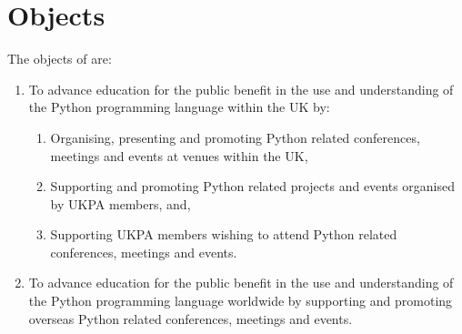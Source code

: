 \section{Objects}\label{sec:objects}
The objects of \shortname{} are:
\begin{enumerate}
        \item To advance education for the public benefit in the use and understanding of the Python programming language within the UK by:
        \begin{enumerate}
                \item Organising, presenting and promoting Python related conferences, meetings and events at venues within the UK,
                \item Supporting and promoting Python related projects and events organised by UKPA members, and,
                \item Supporting UKPA members wishing to attend Python related conferences, meetings and events.
        \end{enumerate}
        \item To advance education for the public benefit in the use and understanding of the Python programming language worldwide by supporting and promoting overseas Python related conferences, meetings and events.
\end{enumerate}
